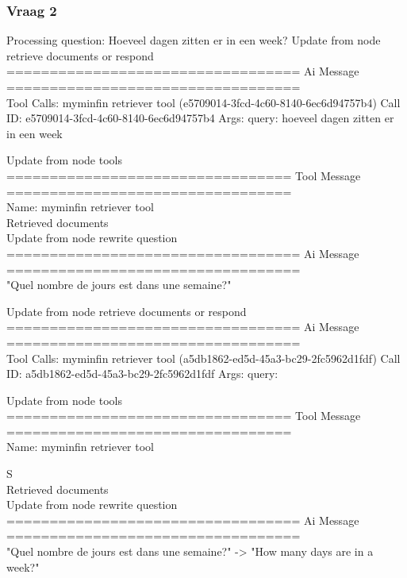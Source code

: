 \subsubsection{Vraag 2}
Processing question: Hoeveel dagen zitten er in een week?
Update from node retrieve  documents  or  respond
\\[1em]
================================== Ai Message ==================================
\\[1em]
Tool Calls:
myminfin  retriever  tool (e5709014-3fcd-4c60-8140-6ec6d94757b4)
Call ID: e5709014-3fcd-4c60-8140-6ec6d94757b4
Args:
query: hoeveel dagen zitten er in een week



Update from node tools
\\[1em]
================================= Tool Message =================================
\\[1em]
Name: myminfin  retriever  tool
\\[1em]
Retrieved documents
\\[1em]
Update from node rewrite  question
\\[1em]
================================== Ai Message ==================================
\\[1em]

"Quel nombre de jours est dans une semaine?"



Update from node retrieve  documents  or  respond
\\[1em]
================================== Ai Message ==================================
\\[1em]
Tool Calls:
myminfin  retriever  tool (a5db1862-ed5d-45a3-bc29-2fc5962d1fdf)
Call ID: a5db1862-ed5d-45a3-bc29-2fc5962d1fdf
Args:
query:



Update from node tools
\\[1em]
================================= Tool Message =================================
\\[1em]
Name: myminfin  retriever  tool

S\\[1em]
Retrieved documents
\\[1em]
Update from node rewrite  question
\\[1em]
================================== Ai Message ==================================
\\[1em]

"Quel nombre de jours est dans une semaine?" -> "How many days are in a week?"

